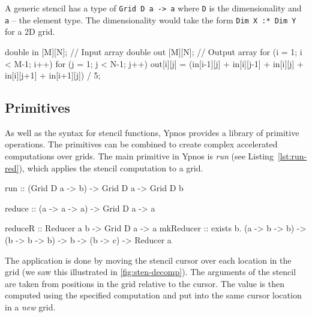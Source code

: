 \documentclass[
    12pt,
    a4paper,
    twoside,
    openright,
    ]{scrbook}
\begin{document}
A generic stencil has a type of \texttt{Grid D a -> a} where \texttt{D} is the
dimensionality and \texttt{a} -- the element type. The dimensionality would take
the form \texttt{Dim X :* Dim Y} for a 2D grid.

\begin{hflisting}[label=lst:avgimp, caption={An imperative implementation of the
    average function. Note that the \texttt{in} index values have been laid out in the shape of the grid.}]
double in [M][N]; // Input array
double out [M][N]; // Output array
for (i = 1; i < M-1; i++){
  for (j = 1; j < N-1; j++){
    out[i][j] =
                 (in[i-1][j] +
     in[i][j-1] + in[i][j] + in[i][j+1]
                + in[i+1][j]) / 5;
  }
}
\end{hflisting}

\subsection{Primitives}
\label{sec:primitives}

As well as the syntax for stencil functions, Ypnos provides a library of
primitive operations. The primitives can be combined to create complex
accelerated computations over grids. The main primitive in Ypnos is \emph{run}
(see Listing~\ref{lst:run-red}), which applies the stencil computation to a
grid.

\begin{hflisting}[label={lst:run-red}, caption={The basic \texttt{run},
\texttt{reduce} and, \texttt{reduceR} primitive as defined in the original Ypnos
paper\cite{ypnos-damp10}. \texttt{reduceR} provides a more general version of
the reducer allowing for intermediary values.}]

run :: (Grid D a -> b) -> Grid D a -> Grid D b

reduce :: (a -> a -> a) -> Grid D a -> a

reduceR :: Reducer a b -> Grid D a -> a
mkReducer :: exists b. (a -> b -> b)
                    -> (b -> b -> b)
                    ->  b
                    -> (b -> c)
                    -> Reducer a
\end{hflisting}

The application is done by moving the stencil cursor over each location in the
grid (we saw this illustrated in \autoref{fig:sten-decomp}). The arguments of
the stencil are taken from positions in the grid relative to the cursor. The
value is then computed using the specified computation and put into the same
cursor location in a \emph{new} grid.
\end{document}
